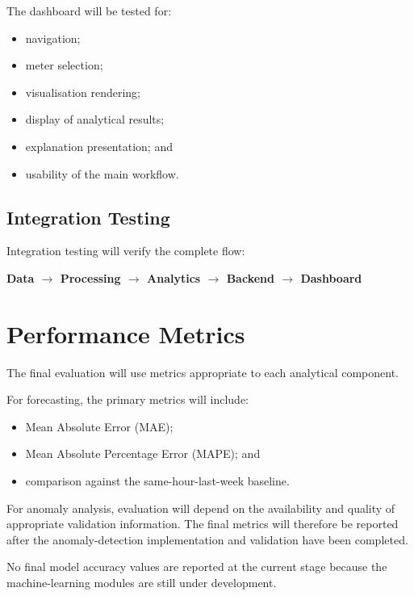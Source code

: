 \documentclass{tietreport}
\begin{document}
The dashboard will be tested for:

\begin{itemize}
    \item navigation;
    \item meter selection;
    \item visualisation rendering;
    \item display of analytical results;
    \item explanation presentation; and
    \item usability of the main workflow.
\end{itemize}

\subsection{Integration Testing}

Integration testing will verify the complete flow:

\begin{center}
\textbf{
Data
$\rightarrow$
Processing
$\rightarrow$
Analytics
$\rightarrow$
Backend
$\rightarrow$
Dashboard
}
\end{center}

\section{Performance Metrics}

The final evaluation will use metrics appropriate to each analytical
component.

For forecasting, the primary metrics will include:

\begin{itemize}
    \item Mean Absolute Error (MAE);
    \item Mean Absolute Percentage Error (MAPE); and
    \item comparison against the same-hour-last-week baseline.
\end{itemize}

For anomaly analysis, evaluation will depend on the availability and quality
of appropriate validation information. The final metrics will therefore be
reported after the anomaly-detection implementation and validation have been
completed.

No final model accuracy values are reported at the current stage because the
machine-learning modules are still under development.
\end{document}
